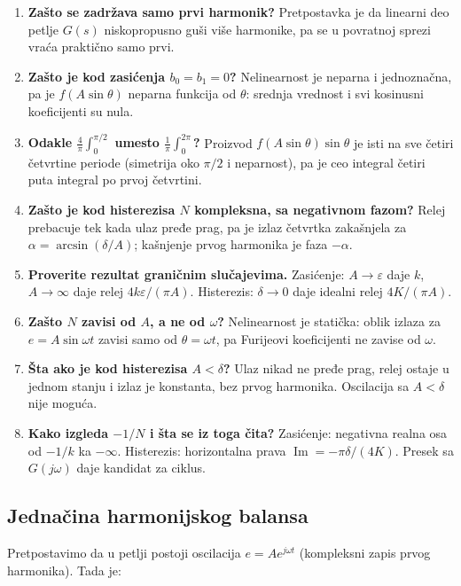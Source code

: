 \documentclass[11pt,a4paper,parskip=half,headsepline,numbers=noenddot]{scrartcl}
\begin{document}
\begin{enumerate}
\def\labelenumi{\arabic{enumi}.}
\item \textbf{Zašto se zadržava samo prvi harmonik?} Pretpostavka je da linearni deo petlje \(G(s)\) niskopropusno guši više harmonike, pa se u povratnoj sprezi vraća praktično samo prvi.
\item \textbf{Zašto je kod zasićenja \(b_0 = b_1 = 0\)?} Nelinearnost je neparna i jednoznačna, pa je \(f(A\sin\theta)\) neparna funkcija od \(\theta\): srednja vrednost i svi kosinusni koeficijenti su nula.
\item \textbf{Odakle \(\frac{4}{\pi}\int_0^{\pi/2}\) umesto \(\frac1\pi\int_0^{2\pi}\)?} Proizvod \(f(A\sin\theta)\sin\theta\) je isti na sve četiri četvrtine periode (simetrija oko \(\pi/2\) i neparnost), pa je ceo integral četiri puta integral po prvoj četvrtini.
\item \textbf{Zašto je kod histerezisa \(N\) kompleksna, sa negativnom fazom?} Relej prebacuje tek kada ulaz pređe prag, pa je izlaz četvrtka zakašnjela za \(\alpha = \arcsin(\delta/A)\); kašnjenje prvog harmonika je faza \(-\alpha\).
\item \textbf{Proverite rezultat graničnim slučajevima.} Zasićenje: \(A \to \varepsilon\) daje \(k\), \(A \to \infty\) daje relej \(4k\varepsilon/(\pi A)\). Histerezis: \(\delta \to 0\) daje idealni relej \(4K/(\pi A)\).
\item \textbf{Zašto \(N\) zavisi od \(A\), a ne od \(\omega\)?} Nelinearnost je statička: oblik izlaza za \(e = A\sin\omega t\) zavisi samo od \(\theta = \omega t\), pa Furijeovi koeficijenti ne zavise od \(\omega\).
\item \textbf{Šta ako je kod histerezisa \(A < \delta\)?} Ulaz nikad ne pređe prag, relej ostaje u jednom stanju i izlaz je konstanta, bez prvog harmonika. Oscilacija sa \(A < \delta\) nije moguća.
\item \textbf{Kako izgleda \(-1/N\) i šta se iz toga čita?} Zasićenje: negativna realna osa od \(-1/k\) ka \(-\infty\). Histerezis: horizontalna prava \(\operatorname{Im} = -\pi\delta/(4K)\). Presek sa \(G(j\omega)\) daje kandidat za ciklus.
\end{enumerate}

\subsection{Jednačina harmonijskog balansa}

Pretpostavimo da u petlji postoji oscilacija \(e = Ae^{j\omega t}\) (kompleksni zapis prvog harmonika). Tada je:
\end{document}
